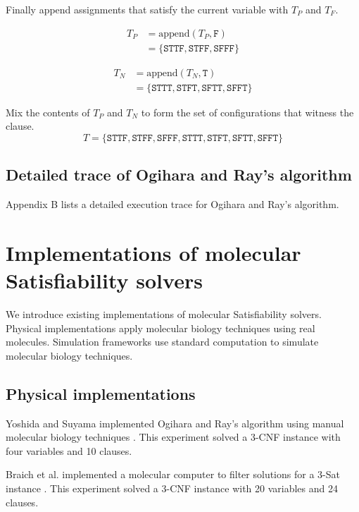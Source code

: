 Finally append assignments that satisfy the current variable with $T_P$ and $T_F$.

\begin{align*}
T_P &= \text{append}(T_P, \texttt{F}) \\
	&= \{ \texttt{STTF}, \texttt{STFF}, \texttt{SFFF} \}
\end{align*}

\begin{align*}
T_N &= \text{append}(T_N, \texttt{T}) \\
	&= \{ \texttt{STTT}, \texttt{STFT}, \texttt{SFTT}, \texttt{SFFT}\}
\end{align*}


\noindent Mix the contents of $T_P$ and $T_N$ to form the set of configurations that witness the clause. 
\[
T = \{ \texttt{STTF}, \texttt{STFF}, \texttt{SFFF},  \texttt{STTT}, \texttt{STFT}, \texttt{SFTT}, \texttt{SFFT}\}
\]
		
	\subsection{Detailed trace of Ogihara and Ray's algorithm}
	
Appendix B lists a detailed execution trace for Ogihara and Ray's algorithm.

\section{Implementations of molecular {\sc Satisfiability} solvers}

We introduce existing implementations of molecular {\sc Satisfiability} solvers.  Physical implementations apply molecular biology techniques using real molecules.  Simulation frameworks use standard computation to simulate molecular biology techniques.

	\subsection{Physical implementations}
	

Yoshida and Suyama implemented Ogihara and Ray's algorithm using manual molecular biology techniques \cite{dnaBasedImplemetation_Yoshida2000}.  This experiment solved a 3-CNF instance with four variables and 10 clauses.

Braich et al. implemented a molecular computer to filter solutions for a 3-{\sc Sat} instance \cite{Braich02solutionof}.  This experiment solved a 3-CNF instance with 20 variables and 24 clauses.
	
